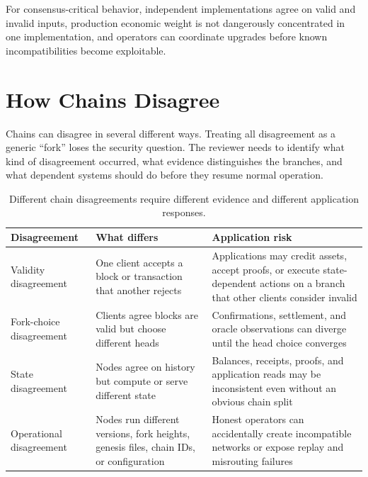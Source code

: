 \begin{codeblock}
For consensus-critical behavior,
independent implementations agree on valid and invalid inputs,
production economic weight is not dangerously concentrated in one implementation,
and operators can coordinate upgrades before known incompatibilities become exploitable.
\end{codeblock}

\section{How Chains Disagree}

Chains can disagree in several different ways. Treating all disagreement as a generic ``fork'' loses the security question. The reviewer needs to identify what kind of disagreement occurred, what evidence distinguishes the branches, and what dependent systems should do before they resume normal operation.

\begin{table}[htbp]
\centering
\small
\renewcommand{\arraystretch}{1.15}
\begin{tabularx}{\textwidth}{@{}>{\RaggedRight\arraybackslash}p{}>{\RaggedRight\arraybackslash}p{}X@{}}
\toprule
Disagreement & What differs & Application risk \\
\midrule
Validity disagreement & One client accepts a block or transaction that another rejects & Applications may credit assets, accept proofs, or execute state-dependent actions on a branch that other clients consider invalid \\
Fork-choice disagreement & Clients agree blocks are valid but choose different heads & Confirmations, settlement, and oracle observations can diverge until the head choice converges \\
State disagreement & Nodes agree on history but compute or serve different state & Balances, receipts, proofs, and application reads may be inconsistent even without an obvious chain split \\
Operational disagreement & Nodes run different versions, fork heights, genesis files, chain IDs, or configuration & Honest operators can accidentally create incompatible networks or expose replay and misrouting failures \\
\bottomrule
\end{tabularx}
\caption{Different chain disagreements require different evidence and different application responses.}
\end{table}

